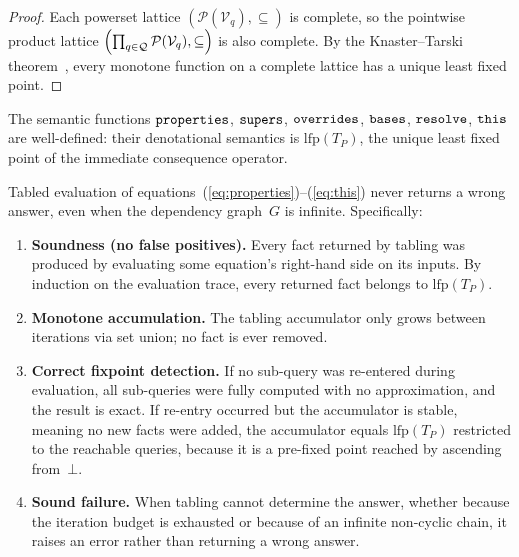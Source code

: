 \begin{proof}
  Each powerset lattice
  $(\mathcal{P}(\mathcal{V}_q), \subseteq)$
  is complete,
  so the pointwise product lattice
  $\Bigl(\prod_{q \in \mathcal{Q}} \mathcal{P}(\mathcal{V}_q), \subseteq\Bigr)$
  is also complete.
  By the Knaster--Tarski
  theorem~\cite{tarski1955-lattice-fixpoint-theorem},
  every monotone function on a complete lattice has a
  unique least fixed point.
\end{proof}

\begin{theorem}\label{thm:well-defined}
  The semantic functions
  $\mathtt{properties}$, $\mathtt{supers}$, $\mathtt{overrides}$, $\mathtt{bases}$,
  $\mathtt{resolve}$, $\mathtt{this}$ are well-defined:
  their denotational semantics is
  $\mathrm{lfp}(T_P)$, the unique least fixed point of
  the immediate consequence operator.
\end{theorem}

\begin{theorem}%
  \label{thm:tabling-soundness}
  Tabled evaluation of
  equations~(\ref{eq:properties})--(\ref{eq:this})
  never returns a wrong answer, even when the
  dependency graph~$G$ is infinite.
  Specifically:
  \begin{enumerate}
    \item \textbf{Soundness (no false positives).}
      Every fact returned by tabling was produced by
      evaluating some equation's right-hand side on its
      inputs.
      By induction on the evaluation trace, every
      returned fact belongs to $\mathrm{lfp}(T_P)$.

    \item \textbf{Monotone accumulation.}
      The tabling accumulator only grows between
      iterations via set union; no fact is ever
      removed.

    \item \textbf{Correct fixpoint detection.}
      If no sub-query was re-entered during evaluation,
      all sub-queries were fully computed with no
      approximation, and the result is exact.
      If re-entry occurred but the accumulator is
      stable, meaning no new facts were added, the
      accumulator equals
      $\mathrm{lfp}(T_P)$ restricted to the reachable
      queries, because it is a pre-fixed point reached
      by ascending from~$\bot$.

    \item \textbf{Sound failure.}
      When tabling cannot determine the answer,
      whether because the iteration budget is exhausted
      or because of an infinite non-cyclic chain,
      it raises an error rather than
      returning a wrong answer.
  \end{enumerate}
\end{theorem}

